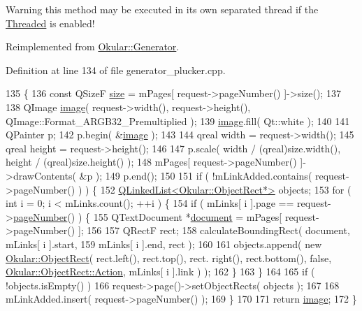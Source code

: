 \begin{DoxyWarning}{Warning}
this method may be executed in its own separated thread if the \hyperlink{classOkular_1_1Generator_a8517096896273a5ba5b970be09313c77a0764a910b194896e72da084c3c51a2d0}{Threaded} is enabled! 
\end{DoxyWarning}


Reimplemented from \hyperlink{classOkular_1_1Generator_a6712c8d3c2759c3a1fcacbd503d3286e}{Okular\+::\+Generator}.



Definition at line 134 of file generator\+\_\+plucker.\+cpp.


\begin{DoxyCode}
135 \{
136     \textcolor{keyword}{const} QSizeF \hyperlink{synctex__parser_8c_aa23c661441688350614bd6a350d2b6ff}{size} = mPages[ request->pageNumber() ]->size();
137 
138     QImage \hyperlink{classPluckerGenerator_abf2fdf796ef43397be0ef607891aa24a}{image}( request->width(), request->height(), QImage::Format\_ARGB32\_Premultiplied );
139     \hyperlink{classPluckerGenerator_abf2fdf796ef43397be0ef607891aa24a}{image}.fill( Qt::white );
140 
141     QPainter p;
142     p.begin( &\hyperlink{classPluckerGenerator_abf2fdf796ef43397be0ef607891aa24a}{image} );
143 
144     qreal width = request->width();
145     qreal height = request->height();
146 
147     p.scale( width / (qreal)size.width(), height / (qreal)size.height() );
148     mPages[ request->pageNumber() ]->drawContents( &p );
149     p.end();
150 
151     \textcolor{keywordflow}{if} ( !mLinkAdded.contains( request->pageNumber() ) ) \{
152         \hyperlink{classQLinkedList}{QLinkedList<Okular::ObjectRect*>} objects;
153         \textcolor{keywordflow}{for} ( \textcolor{keywordtype}{int} i = 0; i < mLinks.count(); ++i ) \{
154             \textcolor{keywordflow}{if} ( mLinks[ i ].page == request->\hyperlink{classOkular_1_1PixmapRequest_a50f959175182137dbb9e2dbd6ddd71aa}{pageNumber}() ) \{
155                 QTextDocument *\hyperlink{classOkular_1_1Generator_a4248672ef04e62660d51f16c0a862bbe}{document} = mPages[ request->pageNumber() ];
156 
157                 QRectF rect;
158                 calculateBoundingRect( document, mLinks[ i ].start,
159                                        mLinks[ i ].end, rect );
160 
161                 objects.append( \textcolor{keyword}{new} \hyperlink{classOkular_1_1ObjectRect}{Okular::ObjectRect}( rect.left(), rect.top(), rect.
      right(), rect.bottom(), \textcolor{keyword}{false}, \hyperlink{classOkular_1_1ObjectRect_a2f77f7653306bae90bfb68277aaafe16a2ad02138861dfdc8bc2a0c29bae5bed2}{Okular::ObjectRect::Action}, mLinks[ i ].link ) );
162             \}
163         \}
164 
165         \textcolor{keywordflow}{if} ( !objects.isEmpty() )
166             request->page()->setObjectRects( objects );
167 
168         mLinkAdded.insert( request->pageNumber() );
169     \}
170 
171     \textcolor{keywordflow}{return} \hyperlink{classPluckerGenerator_abf2fdf796ef43397be0ef607891aa24a}{image};
172 \}
\end{DoxyCode}
